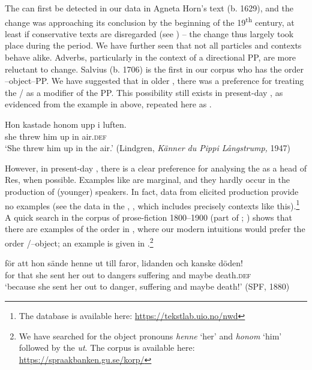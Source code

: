 \documentclass[output=paper]{langscibook}
\begin{document}
The  can first be detected in our data in Agneta Horn’s text (b. 1629), and the change was approaching its conclusion by the beginning of the 19\textsuperscript{th} century, at least if conservative texts are disregarded (see ) – the change thus largely took place during the  period. We have further seen that not all particles and contexts behave alike. Adverbs, particularly in the context of a directional PP, are more reluctant to change. Salvius (b. 1706) is the first in our corpus who has the order –object–PP. We have suggested that in older , there was a preference for treating the / as a modifier of the PP. This possibility still exists in present-day , as evidenced from the example in  above, repeated here as .


\ea\label{ex:lalu:64}
\gll  Hon    kastade   honom   upp     i   luften.\\
she       threw     him     up     in   air.\textsc{def}\\
\glt `She threw him up in the air.’ (Lindgren, \textit{Känner du Pippi Långstrump,} 1947)\\
\z


However, in present-day , there is a clear preference for analysing the  as a head of Res, when possible. Examples like  are marginal, and they hardly occur in the production of (younger) speakers. In fact, data from elicited production provide no examples (see the data in the , \citealt{LundquistEtAl2019}, which includes precisely contexts like this).\footnote{The database is available here: \url{https://tekstlab.uio.no/nwd}}  A quick search in the corpus of  prose-fiction 1800–1900 (part of ; \citealt{BorinEtAl2012}) shows that there are examples of the order in , where our modern intuitions would prefer the order /–object; an example is given in .\footnote{We have searched for the object pronouns \textit{henne} ‘her’ and \textit{honom} ‘him’ followed by the  \textit{ut}. The corpus is available here: \url{https://spraakbanken.gu.se/korp/}}


\ea\label{ex:lalu:65}
\gll  för   att   hon   sände   henne   ut     till   faror, lidanden   och  kanske   döden!\\
for   that     she   sent     her   out     to   dangers suffering   and   maybe   death.\textsc{def}\\
\glt `because she sent her out to danger, suffering and maybe death!’ (SPF, 1880)\\
\z
\end{document}

